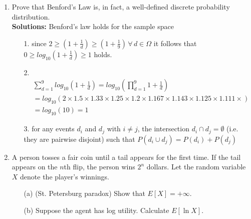 \documentclass[letterpaper,12pt]{article}
\theoremstyle{definition}
\begin{document}
\begin{enumerate}
   	\item Prove that Benford's Law is, in fact, a well-defined discrete probability distribution.\\

\textbf{Solutions:} 
Benford's law holds for the sample space
\begin{itemize}
\item[1.] since $2 \geq (1+\frac{1}{d}) \geq (1+\frac{1}{9}) \, \forall \, d \in \Omega$ it follows that $0 \geq log_{10}(1+\frac{1}{d}) \geq 1$ holds.
\item[2.] \begin{align*}
&\sum_{d=1}^9 log_{10} \left(1+\frac{1}{d}\right )=log_{10}\left(\prod^9_{d=1}1+\frac{1}{d} \right)\\
&=log_{10}(
  2 \times
1.5\times
1.33\times
1.25\times
1.2\times
1.167\times
1.143\times
1.125\times
1.111\times)\\
 &= log_{10}(10)=1
\end{align*}
\item[3.] for any events $d_i$ and $d_j$ with $i\neq j$, the intersection $d_i \cap d_j = \emptyset$ (i.e. they are pairwise disjoint) such that $P(d_i \cup d_j)=P(d_i)+P(d_j)$
\end{itemize}

   	\item A person tosses a fair coin until a tail appears for the first time. If the tail appears on the $n$th flip, the person wins $2^n$ dollars. Let the random variable $X$ denote the player's winnings.
		\begin{itemize}
			\item[(a)] (St. Petersburg paradox) Show that $E[X]= + \infty$.
			\item[(b)] Suppose the agent has log utility. Calculate $E[\ln X]$.\\
			


\end{itemize}
\end{enumerate}
\end{document}
